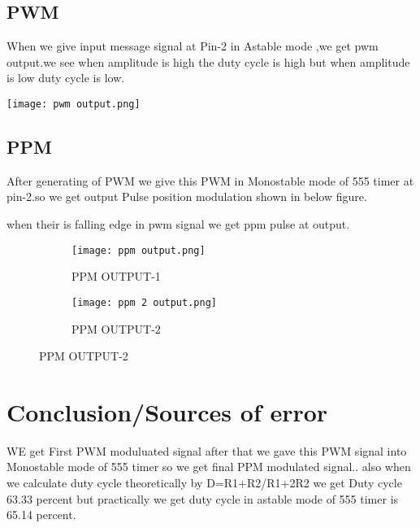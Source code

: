 \documentclass{article}
\begin{document}
\subsection{PWM}
When we give input message signal at Pin-2 in Astable mode ,we get pwm output.we see when amplitude is high the duty cycle is high but when amplitude is low duty cycle is low.
\begin{figure*}[h]
	\centering
	\texttt{[image: pwm output.png]}
	\caption{PWM output}
	\label{FBD}
\end{figure*}




\subsection{PPM}
After generating of PWM we give this PWM in Monostable mode of 555 timer at pin-2.so we get output Pulse position modulation shown in below figure.
\par 
when their is falling edge in pwm signal we get ppm pulse at output.
\begin{figure}[h]
  \begin{subfigure}[b]{0.4\textwidth}
    \texttt{[image: ppm output.png]}
    \caption{PPM OUTPUT-1}
    \label{fig:1}
  \end{subfigure}
  \begin{subfigure}[b]{0.4\textwidth}
    \texttt{[image: ppm 2 output.png]}
    \caption{PPM OUTPUT-2}
    \label{fig:2}
  \end{subfigure}
\end{figure}















\section{Conclusion/Sources of error}
 WE get First PWM moduluated signal after that we gave this PWM signal into Monostable mode of 555 timer so we get final PPM modulated signal..
 also when we calculate duty cycle theoretically by D=R1+R2/R1+2R2 we get Duty cycle 63.33 percent but practically we get duty cycle in astable mode of 555 timer is 65.14 percent.
 
 
\end{document}
